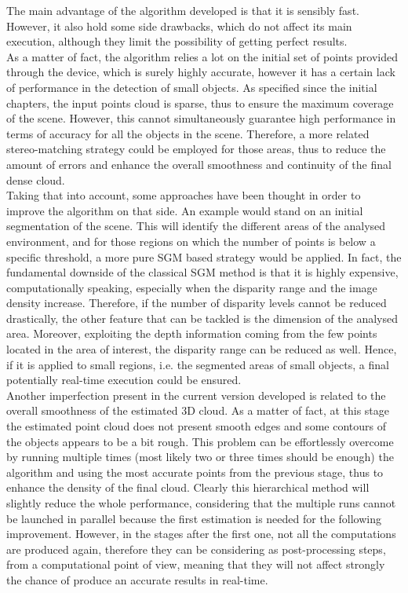 The main advantage of the algorithm developed is that it is sensibly fast.
However, it also hold some side drawbacks, which do not affect its main execution, although they limit the possibility of getting perfect results.\\
As a matter of fact, the algorithm relies a lot on the initial set of points provided through the device, which is surely highly accurate, however it has a certain lack of performance in the detection of small objects.
As specified since the initial chapters, the input points cloud is sparse, thus to ensure the maximum coverage of the scene. 
However, this cannot simultaneously guarantee high performance in terms of accuracy for all the objects in the scene.
Therefore, a more related stereo-matching strategy could be employed for those areas, thus to reduce the amount of errors and enhance the overall smoothness and continuity of the final dense cloud.\\
Taking that into account, some approaches have been thought in order to improve the algorithm on that side.
An example would stand on an initial segmentation of the scene.
This will identify the different areas of the analysed environment, and for those regions on which the number of points is below a specific threshold, a more pure SGM based strategy would be applied. 
In fact, the fundamental downside of the classical SGM method is that it is highly expensive, computationally speaking, especially when the disparity range and the image density increase.
Therefore, if the number of disparity levels cannot be reduced drastically, the other feature that can be tackled is the dimension of the analysed area.
Moreover, exploiting the depth information coming from the few points located in the area of interest, the disparity range can be reduced as well.
Hence, if it is applied to small regions, i.e. the segmented areas of small objects, a final potentially real-time execution could be ensured.\\
Another imperfection present in the current version developed is related to the overall smoothness of the estimated 3D cloud.
As a matter of fact, at this stage the estimated point cloud does not present smooth edges and some contours of the objects appears to be a bit rough.
This problem can be effortlessly overcome by running multiple times (most likely two or three times should be enough) the algorithm and using the most accurate points from the previous stage, thus to enhance the density of the final cloud. 
Clearly this hierarchical method will slightly reduce the whole performance, considering that the multiple runs cannot be launched in parallel because the first estimation is needed for the following improvement.
However, in the stages after the first one, not all the computations are produced again, therefore they can be considering as post-processing steps, from a computational point of view, meaning that they will not affect strongly the chance of produce an accurate results in real-time.\\


